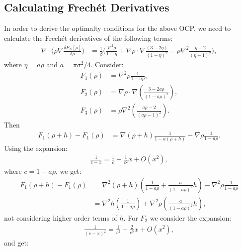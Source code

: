 \documentclass[11pt, a4paper]{article}
\theoremstyle{definition}
\begin{document}
\subsection{Calculating Frech\'et Derivatives}
In order to derive the optimalty conditions for the above OCP, we need to calculate the Frech\'et derivatives of the following terms:
\begin{align*}
	\nabla \cdot \bigg(\rho \nabla \frac{\delta F_{N}[\rho]}{\delta \rho}\bigg)
	&= \frac{1}{\beta} \bigg( \frac{\nabla^2 \rho}{1 - \eta} +  \nabla \rho \cdot \nabla \frac{(3- 2 \eta)}{(1 - \eta)^2}  - \rho \nabla^2\frac{\eta - 2}{(\eta - 1)^2} \bigg),
\end{align*}
where $\eta = a \rho$ and $a = \pi \sigma^2 /4$.
Consider:
\begin{align*}
	F_1(\rho) &= \nabla^2 \rho \frac{1}{1- a\rho},\\
	F_2(\rho) &= \nabla \rho \cdot \nabla \left(\frac{3-2a\rho}{(1-a\rho)^2}\right),\\
	F_3(\rho) &= \rho \nabla^2 \left(\frac{a\rho -2}{(a\rho -1)^2}\right).
\end{align*}
Then
\begin{align*}
	F_1(\rho + h) - F_1(\rho) &= \nabla (\rho +h) \frac{1}{1- a(\rho +h)} - \nabla \rho \frac{1}{1- a\rho}.
\end{align*}
Using the expansion: 
\begin{align*}
	\frac{1}{c - x} = \frac{1}{c} + \frac{1}{c^2}x + O(x^2),
\end{align*}
where $c = 1- a \rho$, we get:
\begin{align*}
	F_1(\rho + h) - F_1(\rho) &= \nabla^2 (\rho +h) \left(\frac{1}{1- a\rho} + \frac{a}{(1- a\rho)^2}h \right)- \nabla^2 \rho \frac{1}{1- a\rho}\\
	&= \nabla^2 h \left(\frac{1}{1- a\rho} \right) + \nabla^2 \rho \left(\frac{a}{(1- a\rho)^2}h\right),
\end{align*}
not considering higher order terms of $h$.
For $F_2$ we consider the expansion:
\begin{align*}
	\frac{1}{(c-x)^2} = \frac{1}{c^2} + \frac{2}{c^3}x + O(x^2),
\end{align*}
and get:
\end{document}
